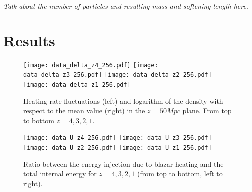 \documentclass[twocolumns]{emulateapj}
\begin{document}
\textit{Talk about the number of particles and resulting mass and softening length here}.


\section{Results}
\begin{figure}[p]
  \centering
  \texttt{[image: data\_delta\_z4\_256.pdf]}
  \texttt{[image: data\_delta\_z3\_256.pdf]}
  \texttt{[image: data\_delta\_z2\_256.pdf]}
  \texttt{[image: data\_delta\_z1\_256.pdf]}
   \caption{Heating rate fluctuations (left) and logarithm of the density with respect to the mean value (right) in the $z=50 Mpc$ plane. From top to bottom $z=4,3,2,1$. }
  \label{fig:slice}
\end{figure}

\begin{figure}[t]
  \centering
  \texttt{[image: data\_U\_z4\_256.pdf]}
  \texttt{[image: data\_U\_z3\_256.pdf]}
  \texttt{[image: data\_U\_z2\_256.pdf]}
  \texttt{[image: data\_U\_z1\_256.pdf]}
   \caption{Ratio between the energy injection due to blazar heating and the total internal energy for $z=4,3,2,1$ (from top to bottom, left to right).}
  \label{fig:heating_ratio}
\end{figure}
\end{document}

